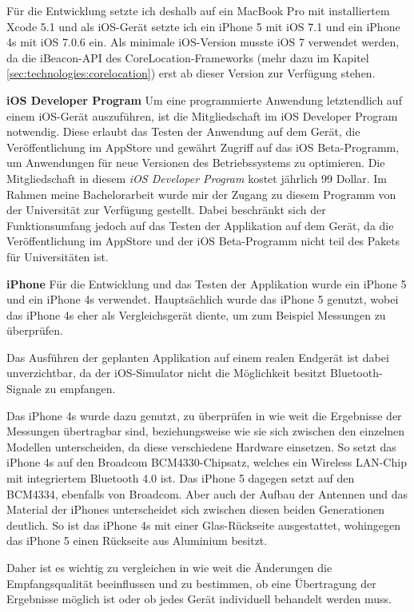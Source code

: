 Für die Entwicklung setzte ich deshalb auf ein MacBook Pro mit installiertem Xcode 5.1 und als iOS-Gerät setzte ich ein iPhone 5 mit iOS 7.1 und ein iPhone 4s mit iOS 7.0.6 ein.
Als minimale iOS-Version musste iOS 7 verwendet werden, da die iBeacon-API des CoreLocation-Frameworks (mehr dazu im Kapitel \ref{sec:technologies:corelocation}) erst ab dieser Version zur Verfügung stehen.

\textbf{iOS Developer Program}
Um eine programmierte Anwendung letztendlich auf einem iOS-Gerät auszuführen, ist die Mitgliedschaft im iOS Developer Program notwendig.
Diese erlaubt das Testen der Anwendung auf dem Gerät, die Veröffentlichung im AppStore und gewährt Zugriff auf das iOS Beta-Programm, um Anwendungen für neue Versionen des Betriebssystems zu optimieren.
Die Mitgliedschaft in diesem \emph{iOS Developer Program} kostet jährlich 99 Dollar. 
Im Rahmen meine Bachelorarbeit wurde mir der Zugang zu diesem Programm von der Universität zur Verfügung gestellt. Dabei beschränkt sich der Funktionsumfang jedoch auf das Testen der Applikation auf dem Gerät, da die Veröffentlichung im AppStore und der iOS Beta-Programm nicht teil des Pakets für Universitäten ist.

\textbf{iPhone}
Für die Entwicklung und das Testen der Applikation wurde ein iPhone 5 und ein iPhone 4s verwendet. 
Hauptsächlich wurde das iPhone 5 genutzt, wobei das iPhone 4s eher als Vergleichsgerät diente, um zum Beispiel Messungen zu überprüfen.

Das Ausführen der geplanten Applikation auf einem realen Endgerät ist dabei unverzichtbar, da der iOS-Simulator nicht die Möglichkeit besitzt Bluetooth-Signale zu empfangen.

Das iPhone 4s wurde dazu genutzt, zu überprüfen in wie weit die Ergebnisse der Messungen übertragbar sind, beziehungsweise wie sie sich zwischen den einzelnen Modellen unterscheiden, da diese verschiedene Hardware einsetzen. So setzt das iPhone 4s auf den Broadcom BCM4330-Chipsatz, welches ein Wireless LAN-Chip mit integriertem Bluetooth 4.0 ist. Das iPhone 5 dagegen setzt auf den BCM4334, ebenfalls von Broadcom. 
Aber auch der Aufbau der Antennen und das Material der iPhones unterscheidet sich zwischen diesen beiden Generationen deutlich. 
So ist das iPhone 4s mit einer Glas-Rückseite ausgestattet, wohingegen das iPhone 5 einen Rückseite aus Aluminium besitzt.

Daher ist es wichtig zu vergleichen in wie weit die Änderungen die Empfangsqualität beeinflussen und zu bestimmen, ob eine Übertragung der Ergebnisse möglich ist oder ob jedes Gerät individuell behandelt werden muss.

